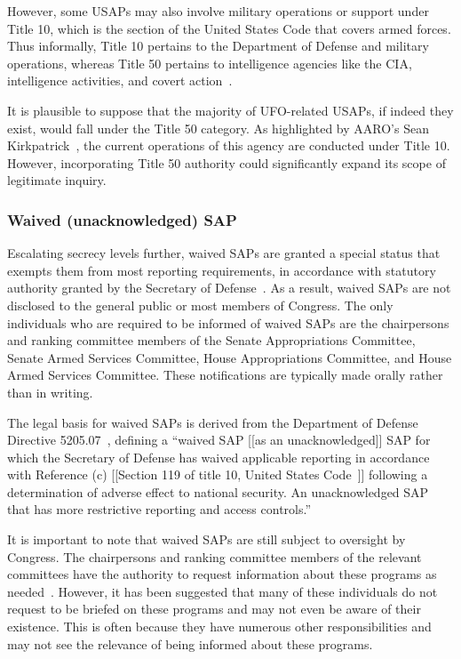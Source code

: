 However, some USAPs may also involve military operations or support under Title 10,
which is the section of the United States Code that covers armed forces.
Thus  informally,  Title 10  pertains to the Department of Defense  and military operations, whereas  Title 50  pertains
to intelligence agencies like the CIA, intelligence activities, and covert action~\cite{wall2011demystifying}.

It is plausible to suppose that the majority of UFO-related USAPs,
if indeed they exist, would fall under the Title 50 category. As highlighted by
AARO's Sean Kirkpatrick~\cite[time = 2410~s]{Kirkpatrick2023Apr}, the current operations of this agency are conducted under Title 10.
However, incorporating Title 50 authority could significantly expand its scope of legitimate inquiry.



\subsubsection{Waived (unacknowledged) SAP}

Escalating secrecy levels further, waived SAPs are granted a special status that exempts them from most reporting requirements, in accordance with statutory authority granted by the Secretary of Defense~\cite{Dolan-MrX-Disclosure2020Jul}. As a result, waived SAPs are not disclosed to the general public or most members of Congress. The only individuals who are required to be informed of waived SAPs are the chairpersons and ranking committee members of the Senate Appropriations Committee, Senate Armed Services Committee, House Appropriations Committee, and House Armed Services Committee. These notifications are typically made orally rather than in writing.


The legal basis for waived SAPs is derived from the Department of Defense Directive 5205.07~\cite{DODDirective5205.07}, defining
a ``waived SAP [[as an unacknowledged]] SAP for which the Secretary of Defense has waived applicable reporting in
accordance with Reference (c) [[Section 119 of title 10, United States Code~\cite{HouseofRepresentatives2021Dec,CornellLaw-10/119-2023Jan}]]
following a determination of adverse effect to national security.
An unacknowledged SAP that has more restrictive reporting and access controls.''

It is important to note that waived SAPs are still subject to oversight by Congress. The chairpersons and ranking committee members of the relevant committees have the authority to request information about these programs as needed~\cite{Dolan-MrX-Disclosure2020Jul}. However, it has been suggested that many of these individuals do not request to be briefed on these programs and may not even be aware of their existence. This is often because they have numerous other responsibilities and may not see the relevance of being informed about these programs.

